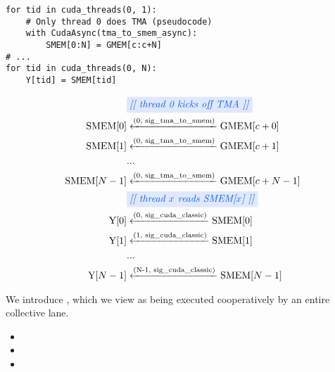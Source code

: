 \begin{minipage}[t]{0.48\textwidth}\codeminipage
\vspace{10mm}
{\color{lightttColor}
\begin{verbatim}
for tid in cuda_threads(0, 1):
    # Only thread 0 does TMA (pseudocode)
    with CudaAsync(tma_to_smem_async):
        SMEM[0:N] = GMEM[c:c+N]
# ...
for tid in cuda_threads(0, N):
    Y[tid] = SMEM[tid]
\end{verbatim}
}
\end{minipage}
\hfill
\begin{minipage}[t]{0.48\textwidth}\fixminipage
{\sffamily
\begin{align*}
    & \blueBox{\textit{[[ thread 0 kicks off TMA ]]}} \\
    \text{SMEM[$0$]} & \xleftarrow{\text{(0, sig\_tma\_to\_smem)}} \text{GMEM[$c+0$]} \\
    \text{SMEM[$1$]} & \xleftarrow{\text{(0, sig\_tma\_to\_smem)}} \text{GMEM[$c+1$]} \\
    & ... \\
    \text{SMEM[$N-1$]} & \xleftarrow{\text{(0, sig\_tma\_to\_smem)}} \text{GMEM[$c+N-1$]} \\
    & \blueBox{\textit{[[ thread $x$ reads SMEM[$x$] ]]}} \\
    \text{Y[$0$]} & \xleftarrow{\text{(0, sig\_cuda\_classic)}} \text{SMEM[$0$]} \\
    \text{Y[$1$]} & \xleftarrow{\text{(1, sig\_cuda\_classic)}} \text{SMEM[$1$]} \\
    & ... \\
    \text{Y[$N-1$]} & \xleftarrow{\text{(N-1, sig\_cuda\_classic)}} \text{SMEM[$N-1$]} \\
\end{align*}
}
\end{minipage}

\filbreak
{}

We introduce , which we view as being executed cooperatively by an entire collective lane.

\filbreak
\begin{itemize}
  \item {}
  \item {}
  \item {}
\end{itemize}

